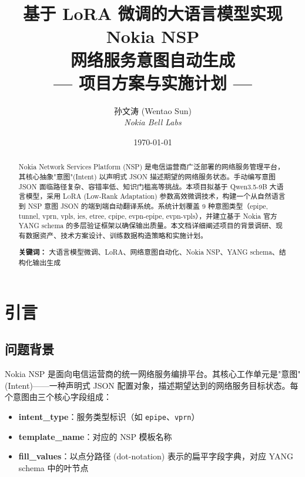 \documentclass[12pt, a4paper]{article}
\title{%
  \vspace{-1cm}
  {\LARGE\bfseries 基于 LoRA 微调的大语言模型实现 Nokia NSP\\[4pt]
  网络服务意图自动生成}\\[12pt]
  {\large --- 项目方案与实施计划 ---}
}
\author{%
  孙文涛 (Wentao Sun) \\[3pt]
  {\small\textit{Nokia Bell Labs}}
}
\date{\today}
\newcommand{\intenttype}[1]{\texttt{#1}}
\newcommand{\yang}{\textsc{YANG}}
\newcommand{\nsp}{\textsc{NSP}}
\newcommand{\lora}{\textsc{LoRA}}
\begin{document}
\maketitle
\thispagestyle{empty}

\begin{abstract}
\noindent
Nokia Network Services Platform (\nsp{}) 是电信运营商广泛部署的网络服务管理平台，其核心抽象"意图"(Intent) 以声明式 JSON 描述期望的网络服务状态。手动编写意图 JSON 面临路径复杂、容错率低、知识门槛高等挑战。本项目拟基于 Qwen3.5-9B 大语言模型，采用 \lora{} (Low-Rank Adaptation) 参数高效微调技术，构建一个从自然语言到 \nsp{} 意图 JSON 的端到端自动翻译系统。系统计划覆盖 9 种意图类型（epipe, tunnel, vprn, vpls, ies, etree, cpipe, evpn-epipe, evpn-vpls），并建立基于 Nokia 官方 \yang{} schema 的多层验证框架以确保输出质量。本文档详细阐述项目的背景调研、现有数据资产、技术方案设计、训练数据构造策略和实施计划。

\vspace{6pt}
\noindent\textbf{关键词：} 大语言模型微调、LoRA、网络意图自动化、Nokia NSP、YANG schema、结构化输出生成
\end{abstract}

\newpage
\tableofcontents
\newpage

\section{引言}

\subsection{问题背景}

Nokia \nsp{} 是面向电信运营商的统一网络服务编排平台。其核心工作单元是"意图" (Intent)——一种声明式 JSON 配置对象，描述期望达到的网络服务目标状态。每个意图由三个核心字段组成：

\begin{itemize}
  \item \textbf{intent\_type}：服务类型标识（如 \intenttype{epipe}、\intenttype{vprn}）
  \item \textbf{template\_name}：对应的 \nsp{} 模板名称
  \item \textbf{fill\_values}：以点分路径 (dot-notation) 表示的扁平字段字典，对应 \yang{} schema 中的叶节点
\end{itemize}
\end{document}
